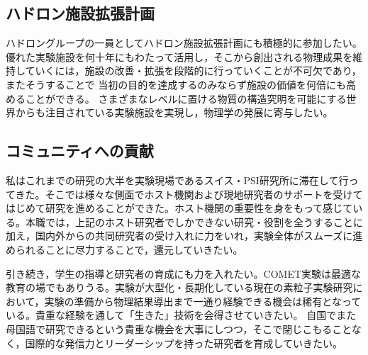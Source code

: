 \documentclass[11pt,a4paper,uplatex,dvipdfmx]{ujarticle} 		%
\newcommand{\研究課題名}{象の卵}
\newcommand{\研究機関名}{東京大学}
\newcommand{\研究代表者氏名}{内山雄祐}
\newcommand{\研究期間の最終元号年度}{6}  %
\begin{document}
%


\subsection{ハドロン施設拡張計画}
ハドロングループの一員としてハドロン施設拡張計画にも積極的に参加したい。
優れた実験施設を何十年にもわたって活用し，そこから創出される物理成果を維持していくには，施設の改善・拡張を段階的に行っていくことが不可欠であり，またそうすることで
当初の目的を達成するのみならず施設の価値を何倍にも高めることができる。
さまざまなレベルに置ける物質の構造究明を可能にする世界からも注目されている実験施設を実現し，物理学の発展に寄与したい。



\subsection{コミュニティへの貢献}
私はこれまでの研究の大半を実験現場であるスイス・PSI研究所に滞在して行ってきた。そこでは様々な側面でホスト機関および現地研究者のサポートを受けてはじめて研究を進めることができた。ホスト機関の重要性を身をもって感じている。本職では，上記のホスト研究者でしかできない研究・役割を全うすることに加え，国内外からの共同研究者の受け入れに力をいれ，実験全体がスムーズに進められることに尽力することで，還元していきたい。

引き続き，学生の指導と研究者の育成にも力を入れたい。COMET実験は最適な教育の場でもありうる。実験が大型化・長期化している現在の素粒子実験研究において，実験の準備から物理結果導出まで一通り経験できる機会は稀有となっている。貴重な経験を通して「生きた」技術を会得させていきたい。
自国でまた母国語で研究できるという貴重な機会を大事にしつつ，そこで閉じこもることなく，国際的な発信力とリーダーシップを持った研究者を育成していきたい。

\end{document}

